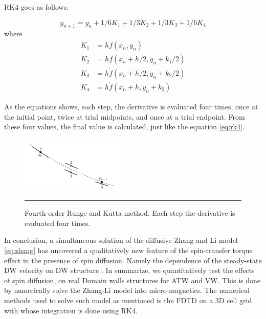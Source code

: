 RK4 goes as follows:

\begin{equation} \label{eq:rk4}
y_{n+1} = y_{n} + 1/6 K_{1} + 1/3 K_{2} +1/3 K_{3} + 1/6 K_{4}
\end{equation}
where
\begin{equation}
\begin{split} \label{eq:rksplit}
K_{1} &= h \dot f(x_{n}, y_{n}) \\
K_{2} &= h \dot f(x_{n} + h/2, y_{n} + k_{1}/2) \\
K_{3} &= h \dot f(x_{n} + h/2, y_{n} + k_{2}/2) \\
K_{4} &= h \dot f(x_{n} + h, y_{n} + k_{3})
\end{split}
\end{equation}

As the equations shows, each step, the derivative is evaluated four times, once at the initial point, twice at trial midpoints, and once at a trial endpoint. From these four values, the final value is calculated, just like the equation \ref{eq:rk4}.

\begin{figure}[htbp]
	\centering
		\includegraphics[width=0.45\textwidth]{Figures/rk4.png}
		\rule{35em}{0.5pt}
	\caption[Fourth-order Runge and Kutta Method]{Fourth-order Runge and Kutta method, Each step the derivative is evaluated four times. }
	\label{fig:kutta}
\end{figure}


\vspace{3.5em}

In conclusion, a simultaneous solution of the diffusive Zhang and Li model \ref{eq:zhang} has uncovered a qualitatively new feature of the spin-transfer torque effect in the presence of spin diffusion. Namely the dependence of the steady-state DW velocity on DW structure \cite{claudio}. In summarize, we quantitatively test the effects of spin diffusion, on real Domain walls structures for ATW and VW. This is done by numerically solve the Zhang-Li model into micro-magnetics. The numerical methods used to solve such model as mentioned is the FDTD on a 3D cell grid with whose integration is done using RK4.






